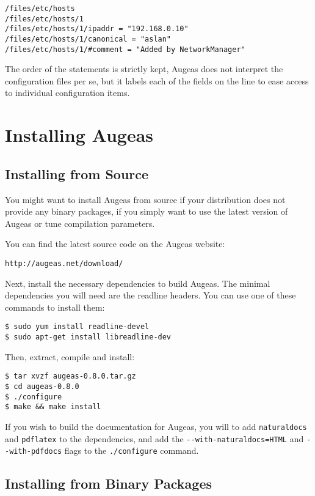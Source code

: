 \begin{verbatim}
/files/etc/hosts
/files/etc/hosts/1
/files/etc/hosts/1/ipaddr = "192.168.0.10"
/files/etc/hosts/1/canonical = "aslan"
/files/etc/hosts/1/#comment = "Added by NetworkManager"
\end{verbatim}
The order of the statements is strictly kept, Augeas does not interpret the configuration files per se, but it labels each of the fields on the line to ease access to individual configuration items.

\section*{Installing Augeas}

\label{sec:installing_augeas} 

\subsection*{Installing from Source}


You might want to install Augeas from source if your distribution does not provide any binary packages, if you simply want to use the latest version of Augeas or tune compilation parameters.

You can find the latest source code on the Augeas website:

\begin{verbatim}
http://augeas.net/download/
\end{verbatim}
Next, install the necessary dependencies to build Augeas. The minimal dependencies you will need are the readline headers. You can use one of these commands to install them:

\begin{verbatim}
$ sudo yum install readline-devel
$ sudo apt-get install libreadline-dev
\end{verbatim}
Then, extract, compile and install:

\begin{verbatim}
$ tar xvzf augeas-0.8.0.tar.gz
$ cd augeas-0.8.0
$ ./configure
$ make && make install
\end{verbatim}
If you wish to build the documentation for Augeas, you will to add \verb!naturaldocs! and \verb!pdflatex! to the dependencies, and add the \verb!--with-naturaldocs=HTML! and \verb!--with-pdfdocs! flags to the \verb!./configure! command.

\subsection*{Installing from Binary Packages}

